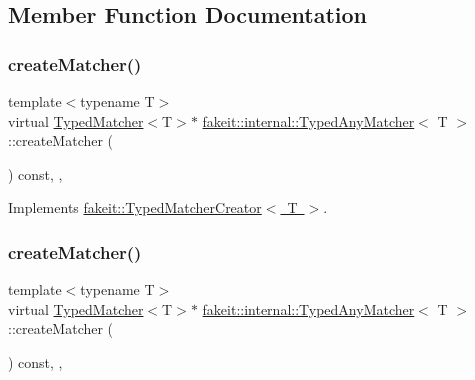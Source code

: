 \subsection{Member Function Documentation}
\mbox{\label{structfakeit_1_1internal_1_1TypedAnyMatcher_a4306295a5059d27896ccb3370275c4ce}} 
\subsubsection{\texorpdfstring{createMatcher()}{createMatcher()}\hspace{0.1cm}{\footnotesize\ttfamily [1/9]}}
{\footnotesize\ttfamily template$<$typename T$>$ \\
virtual \mbox{\hyperlink{structfakeit_1_1TypedMatcher}{Typed\+Matcher}}$<$T$>$$\ast$ \mbox{\hyperlink{structfakeit_1_1internal_1_1TypedAnyMatcher}{fakeit\+::internal\+::\+Typed\+Any\+Matcher}}$<$ T $>$\+::create\+Matcher (\begin{DoxyParamCaption}{ }\end{DoxyParamCaption}) const\hspace{0.3cm}{\ttfamily [inline]}, {\ttfamily [override]}, {\ttfamily [virtual]}}



Implements \mbox{\hyperlink{structfakeit_1_1TypedMatcherCreator_a40646cd11f8acf5c34b971f396891d5c}{fakeit\+::\+Typed\+Matcher\+Creator$<$ T $>$}}.

\mbox{\label{structfakeit_1_1internal_1_1TypedAnyMatcher_a4306295a5059d27896ccb3370275c4ce}} 
\subsubsection{\texorpdfstring{createMatcher()}{createMatcher()}\hspace{0.1cm}{\footnotesize\ttfamily [2/9]}}
{\footnotesize\ttfamily template$<$typename T$>$ \\
virtual \mbox{\hyperlink{structfakeit_1_1TypedMatcher}{Typed\+Matcher}}$<$T$>$$\ast$ \mbox{\hyperlink{structfakeit_1_1internal_1_1TypedAnyMatcher}{fakeit\+::internal\+::\+Typed\+Any\+Matcher}}$<$ T $>$\+::create\+Matcher (\begin{DoxyParamCaption}{ }\end{DoxyParamCaption}) const\hspace{0.3cm}{\ttfamily [inline]}, {\ttfamily [override]}, {\ttfamily [virtual]}}



